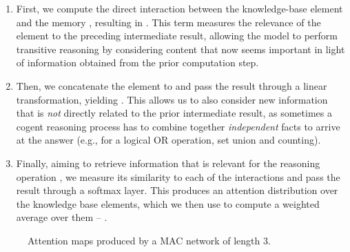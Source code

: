 \documentclass[fleqn]{article}
\begin{document}
\begin{enumerate}  
\item First, we compute the direct interaction between the knowledge-base element  and the memory , resulting in . This term measures the relevance of the element to the preceding intermediate result, allowing the model to perform transitive reasoning by considering content that now seems important in light of information obtained from the prior computation step. 

\item Then, we concatenate the element  to  and pass the result through a linear transformation, yielding . This allows us to also consider new information that is \textit{not} directly related to the prior intermediate result, as sometimes a cogent reasoning process has to combine together \textit{independent} facts to arrive at the answer (e.g., for a logical OR operation, set union and counting). 

\item Finally, aiming to retrieve information that is relevant for the reasoning operation , we measure its similarity to each of the interactions  and pass the result through a softmax layer. This produces an attention distribution over the knowledge base elements, which we then use to compute a weighted average over them -- .

\end{enumerate}  

\begin{wrapfigure}[15]{r}{0.32\textwidth}
\vspace*{-8mm}
\begin{minipage}{0.4\linewidth}
\centering
\vspace*{3mm}
\end{minipage}
\begin{minipage}{0.58\linewidth}
\noindent
\centering
{}

\vspace*{-3.5mm}

\vspace*{-3.5mm}
\end{minipage}

\scriptsize 

\vspace*{-1mm}
\caption{Attention maps produced by a MAC network of length 3.}
\label{fig:rexample}
\end{wrapfigure}
\end{document}
